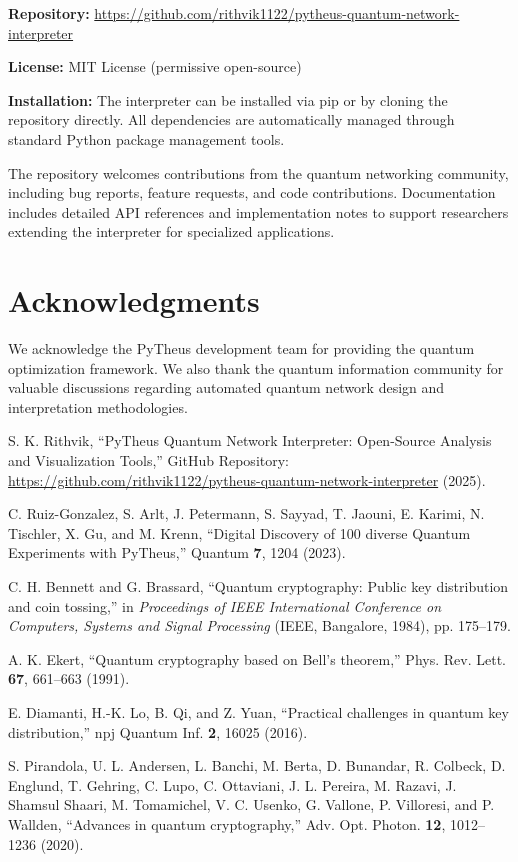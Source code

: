 \documentclass[11pt,a4paper]{article}
\begin{document}
\textbf{Repository:} \url{https://github.com/rithvik1122/}\newline\url{pytheus-quantum-network-interpreter}

\textbf{License:} MIT License (permissive open-source)

\textbf{Installation:} The interpreter can be installed via pip or by cloning the repository directly. All dependencies are automatically managed through standard Python package management tools.

The repository welcomes contributions from the quantum networking community, including bug reports, feature requests, and code contributions. Documentation includes detailed API references and implementation notes to support researchers extending the interpreter for specialized applications.

\section{Acknowledgments}

We acknowledge the PyTheus development team for providing the quantum optimization framework. We also thank the quantum information community for valuable discussions regarding automated quantum network design and interpretation methodologies.

\begin{thebibliography}{99}

S. K. Rithvik,
``PyTheus Quantum Network Interpreter: Open-Source Analysis and Visualization Tools,''
GitHub Repository: \url{https://github.com/rithvik1122/pytheus-quantum-network-interpreter} (2025).

C. Ruiz-Gonzalez, S. Arlt, J. Petermann, S. Sayyad, T. Jaouni, E. Karimi, N. Tischler, X. Gu, and M. Krenn,
``Digital Discovery of 100 diverse Quantum Experiments with PyTheus,''
Quantum \textbf{7}, 1204 (2023).

C. H. Bennett and G. Brassard,
``Quantum cryptography: Public key distribution and coin tossing,''
in \emph{Proceedings of IEEE International Conference on Computers, Systems and Signal Processing} (IEEE, Bangalore, 1984), pp. 175--179.

A. K. Ekert,
``Quantum cryptography based on Bell's theorem,''
Phys. Rev. Lett. \textbf{67}, 661--663 (1991).

E. Diamanti, H.-K. Lo, B. Qi, and Z. Yuan,
``Practical challenges in quantum key distribution,''
npj Quantum Inf. \textbf{2}, 16025 (2016).

S. Pirandola, U. L. Andersen, L. Banchi, M. Berta, D. Bunandar, R. Colbeck, D. Englund, T. Gehring, C. Lupo, C. Ottaviani, J. L. Pereira, M. Razavi, J. Shamsul Shaari, M. Tomamichel, V. C. Usenko, G. Vallone, P. Villoresi, and P. Wallden,
``Advances in quantum cryptography,''
Adv. Opt. Photon. \textbf{12}, 1012--1236 (2020).

\end{thebibliography}
\end{document}
